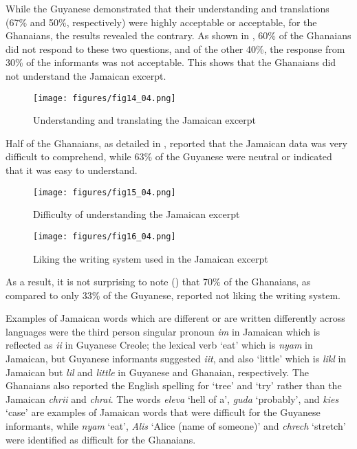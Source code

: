 \documentclass[output=paper,colorlinks,citecolor=brown]{langscibook}
\begin{document}
While the Guyanese demonstrated that their understanding and translations (67\% and 50\%, respectively) were highly acceptable or acceptable, for the Ghanaians, the results revealed the contrary. As shown in , 60\% of the Ghanaians did not respond to these two questions, and of the other 40\%, the response from 30\% of the informants was not acceptable. This shows that the Ghanaians did not understand the Jamaican excerpt.

\begin{figure}
    \texttt{[image: figures/fig14\_04.png]}
    \caption{Understanding and translating the Jamaican excerpt}
    \label{fig:fig14_04}
\end{figure}

Half of the Ghanaians, as detailed in , reported that the Jamaican data was very difficult to comprehend, while 63\% of the Guyanese were neutral or indicated that it was easy to understand.

\begin{figure}
    \texttt{[image: figures/fig15\_04.png]}
    \caption{Difficulty of understanding the Jamaican excerpt}
    \label{fig:fig15_04}
\end{figure}

\begin{figure}
    \texttt{[image: figures/fig16\_04.png]}
    \caption{Liking the writing system used in the Jamaican excerpt}
    \label{fig:fig16_04}
\end{figure}

As a result, it is not surprising to note () that 70\% of the Ghanaians, as compared to only 33\% of the Guyanese, reported not liking the writing system.


Examples of Jamaican words which are different or are written differently across languages were the third person singular pronoun \emph{im} in Jamaican which is reflected as \emph{ii} in Guyanese Creole; the lexical verb ‘eat’ which is \emph{nyam} in Jamaican, but Guyanese informants suggested \emph{iit}, and also ‘little’ which is \emph{likl} in Jamaican but \emph{lil} and \emph{little} in Guyanese and Ghanaian, respectively. The Ghanaians also reported the English spelling for ‘tree’ and ‘try’ rather than the Jamaican \emph{chrii} and \emph{chrai}. The words \emph{eleva} ‘hell of a’, \emph{guda} ‘probably’, and \emph{kies} ‘case’ are examples of Jamaican words that were difficult for the Guyanese informants, while \emph{nyam} ‘eat’, \emph{Alis} ‘Alice (name of someone)’ and \emph{chrech} ‘stretch’ were identified as difficult for the Ghanaians.
\end{document}
